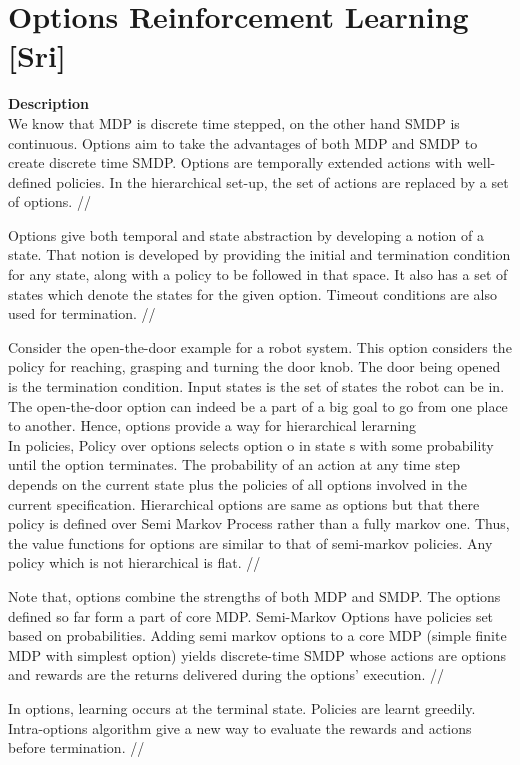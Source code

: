 \section{Options Reinforcement Learning [Sri]}
\textbf{Description} \\

We know that MDP is discrete time stepped, on the other hand SMDP is continuous. Options aim to take the advantages of both MDP and SMDP to create discrete time SMDP. Options are temporally extended actions with well-defined policies. In the hierarchical set-up, the set of actions are replaced by a set of options. //

Options give both temporal and state abstraction by developing a notion of a state. That notion is developed by providing the initial and termination condition for any state, along with a policy to be followed in that space. It also has a set of states which denote the states for the given option. Timeout conditions are also used for termination. //

Consider the open-the-door example for a robot system. This option considers the policy for reaching, grasping and turning the door knob. The door being opened is the termination condition. Input states is the set of states the robot can be in. The open-the-door option can indeed be a part of a big goal to go from one place to another. Hence, options provide a way for hierarchical lerarning \\


In policies, Policy over options selects option o in state s with some probability until the option terminates. The probability of an action at any time step depends on the current state plus the policies of all options involved in the current specification.  Hierarchical options are same as options but that there policy is defined over Semi Markov Process rather than a fully markov one. Thus, the value functions for options are similar to that of semi-markov policies. Any policy which is not hierarchical is flat. // 


Note that, options combine the strengths of both MDP and SMDP. The options defined so far form a part of core MDP. Semi-Markov Options have policies set based on probabilities. 
Adding semi markov options to a core MDP (simple finite MDP with simplest option) yields discrete-time SMDP whose actions are options and rewards are the returns delivered during the options’ execution. //

In options, learning occurs at the terminal state. Policies are learnt greedily. Intra-options algorithm give a new way to evaluate the rewards and actions before termination. //

